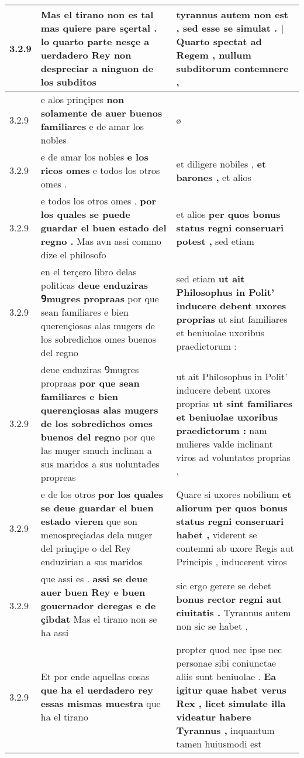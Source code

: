 \begin{tabular}{|p{1cm}|p{6.5cm}|p{6.5cm}|}
3.2.9 & Mas el tirano non es tal \textbf{ mas quiere pare sçertal . lo quarto parte nesçe a uerdadero Rey } non despreciar a ninguon de los subditos & tyrannus autem non est , \textbf{ sed esse se simulat . | Quarto spectat ad Regem , } nullum subditorum contemnere , \\\hline
3.2.9 & e alos prinçipes \textbf{ non solamente de auer buenos familiares } e de amar los nobles & ø \\\hline
3.2.9 & e de amar los nobles \textbf{ e los ricos omes } e todos los otros omes . & et diligere nobiles , \textbf{ et barones , } et alios \\\hline
3.2.9 & e todos los otros omes . \textbf{ por los quales se puede guardar el buen estado del regno . } Mas avn assi commo dize el philosofo & et alios \textbf{ per quos bonus status regni conseruari potest , } sed etiam \\\hline
3.2.9 & en el terçero libro delas politicas \textbf{ deue enduziras Ꝯmugres propraas } por que sean familiares e bien querençiosas alas mugers de los sobredichos omes buenos del regno & sed etiam \textbf{ ut ait Philosophus in Polit’ inducere debent uxores proprias } ut sint familiares et beniuolae uxoribus praedictorum : \\\hline
3.2.9 & deue enduziras Ꝯmugres propraas \textbf{ por que sean familiares e bien querençiosas alas mugers de los sobredichos omes buenos del regno } por que las muger smuch inclinan a sus maridos a sus uoluntades propreas & ut ait Philosophus in Polit’ inducere debent uxores proprias \textbf{ ut sint familiares et beniuolae uxoribus praedictorum : } nam mulieres valde inclinant viros ad voluntates proprias , \\\hline
3.2.9 & e de los otros \textbf{ por los quales se deue guardar el buen estado vieren } que son menospreçiadas dela muger del prinçipe o del Rey enduzirian a sus maridos & Quare si uxores nobilium \textbf{ et aliorum per quos bonus status regni conseruari habet , } viderent se contemni ab uxore Regis aut Principis , inducerent viros \\\hline
3.2.9 & que assi es . \textbf{ assi se deue auer buen Rey e buen gouernador deregas e de çibdat } Mas el tirano non se ha assi & sic ergo gerere se debet \textbf{ bonus rector regni aut ciuitatis . } Tyrannus autem non sic se habet , \\\hline
3.2.9 & Et por ende aquellas cosas \textbf{ que ha el uerdadero rey essas mismas muestra } que ha el tirano & propter quod nec ipse nec personae sibi coniunctae aliis sunt beniuolae . \textbf{ Ea igitur quae habet verus Rex , licet simulate illa videatur habere Tyrannus , } inquantum tamen huiusmodi est \\\hline

\end{tabular}
